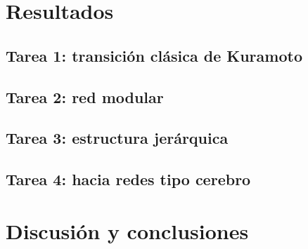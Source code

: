 \documentclass[
  reprint,
  amsmath,amssymb,
  aps,
  pra,            %
]{revtex4-2}
\begin{document}
\section{Resultados}
\label{sec:resultados}

\subsection{Tarea 1: transici\'on cl\'asica de Kuramoto}
\label{sec:tarea1}


\subsection{Tarea 2: red modular}
\label{sec:tarea2}

\subsection{Tarea 3: estructura jer\'arquica}
\label{sec:tarea3}

\subsection{Tarea 4: hacia redes tipo cerebro}
\label{sec:tarea4}


\section{Discusi\'on y conclusiones}
\label{sec:conclusiones}


\begin{acknowledgments}
\end{acknowledgments}



\end{document}
